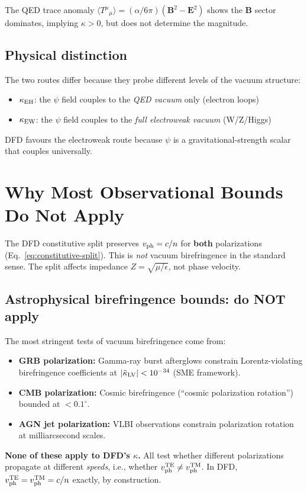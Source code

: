 \documentclass[11pt,a4paper]{article}
\theoremstyle{definition}
\begin{document}
The QED trace anomaly $\langle T^\mu{}_\mu\rangle =
(\alpha/6\pi)(\mathbf{B}^2 - \mathbf{E}^2)$ shows the
$\mathbf{B}$ sector dominates, implying $\kappa > 0$, but does
not determine the magnitude.

\subsection{Physical distinction}

The two routes differ because they probe different levels of the
vacuum structure:
\begin{itemize}
\item $\kappa_{\rm EH}$: the $\psi$ field couples to the
  \emph{QED vacuum} only (electron loops)
\item $\kappa_{\rm EW}$: the $\psi$ field couples to the
  \emph{full electroweak vacuum} (W/Z/Higgs)
\end{itemize}
DFD favours the electroweak route because $\psi$ is a
gravitational-strength scalar that couples universally.


\section{Why Most Observational Bounds Do Not Apply}
\label{sec:inapplicable}

\begin{tcolorbox}[colback=yellow!5!white, colframe=yellow!60!black,
  title=Critical Structural Point]
The DFD constitutive split preserves
$v_{\rm ph} = c/n$ for \textbf{both} polarizations
(Eq.~\ref{eq:constitutive-split}).  This is \emph{not} vacuum
birefringence in the standard sense.  The split affects
impedance $Z = \sqrt{\mu/\epsilon}$, not phase velocity.
\end{tcolorbox}

\subsection{Astrophysical birefringence bounds: do NOT apply}

The most stringent tests of vacuum birefringence come from:
\begin{itemize}
\item \textbf{GRB polarization:} Gamma-ray burst afterglows
  constrain Lorentz-violating birefringence coefficients at
  $|\tilde\kappa_{\rm LV}| < 10^{-34}$ (SME framework).
\item \textbf{CMB polarization:} Cosmic birefringence
  (``cosmic polarization rotation'') bounded at $< 0.1^\circ$.
\item \textbf{AGN jet polarization:} VLBI observations
  constrain polarization rotation at milliarcsecond scales.
\end{itemize}
\textbf{None of these apply to DFD's $\kappa$.}  All test
whether different polarizations propagate at different
\emph{speeds}, i.e., whether $v_{\rm ph}^{\rm TE} \neq
v_{\rm ph}^{\rm TM}$.  In DFD, $v_{\rm ph}^{\rm TE} =
v_{\rm ph}^{\rm TM} = c/n$ exactly, by construction.
\end{document}

